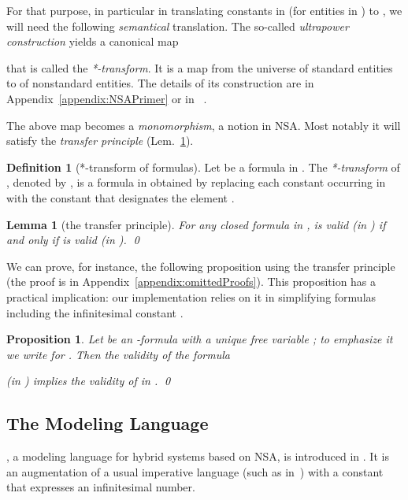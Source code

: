 \documentclass[envcountsect,orivec]{llncs} \pdfoutput=1
\newtheorem{mylem}[mythm]{Lemma}
\newtheorem{myprop}[mythm]{Proposition}
\theoremstyle{definition}
\newtheorem{mydef}[mythm]{Definition}
\def\myqed{\qed}
\begin{document}
 For that purpose, in particular in translating constants in  (for entities in
 ) to ,  we will need the following \emph{semantical} translation. 
 The so-called \emph{ultrapower construction} yields a canonical map

that is called the \emph{*-transform}. 
It is a map from the universe  of standard entities
to  of nonstandard entities.  The details of its
 construction are in Appendix~\ref{appendix:NSAPrimer} or in ~\cite{Hurd1985}. 



 The above map  becomes a \emph{monomorphism}, a notion in
 NSA.  Most notably it will satisfy
 the \emph{transfer principle} (Lem.~\ref{lemma:transferPrinciple}).


\begin{mydef}[*-transform of formulas]\label{definition:starTransformOfFormulas}
 Let  be a formula in . The \emph{*-transform} of , denoted
 by , is 
 a formula in  obtained by replacing each constant  occurring
 in  with the constant  that designates the element .
\end{mydef}



\begin{mylem}[the transfer principle]\label{lemma:transferPrinciple}
 For any closed formula  in ,  is valid (in ) if and
 only if  is valid (in ).  \myqed
\end{mylem}


We can prove, for instance, the following proposition using the transfer
principle (the proof is in Appendix~\ref{appendix:omittedProofs}). 
This proposition has a practical implication: our implementation relies
on it 
in simplifying formulas including the infinitesimal constant .

\begin{myprop}\label{prop:dtToQE}
 Let  be an -formula with a unique free variable ; to
 emphasize it we write  for . 
Then the validity of the formula

(in ) implies the validity of  in .
\myqed
\end{myprop}

\subsection{The Modeling Language }\label{subsec:whiledt}


, a modeling language for hybrid systems based on NSA, is introduced in \cite{Suenaga2011}.
It is an augmentation of a usual imperative language (such as  in~\cite{Winskel1993}) with a constant  that expresses an infinitesimal number.
\end{document}
